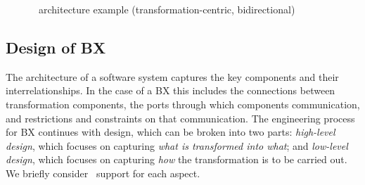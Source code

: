 \begin{figure}[htbp]
\caption{\transml\ architecture example (transformation-centric, bidirectional)}
\label{fig:architecture-example3}
\end{figure}

\subsection{Design of BX}
The architecture of a software system captures the key components and their interrelationships. In the case of a BX this includes the connections between transformation components, the ports through which components communication, and restrictions and constraints on that communication. The engineering process for BX continues with design, which can be broken into two parts: \textit{high-level design}, which focuses on capturing \textit{what is transformed into what}; and \textit{low-level design}, which focuses on capturing \textit{how} the transformation is to be carried out. We briefly consider \transml\ support for each aspect.

